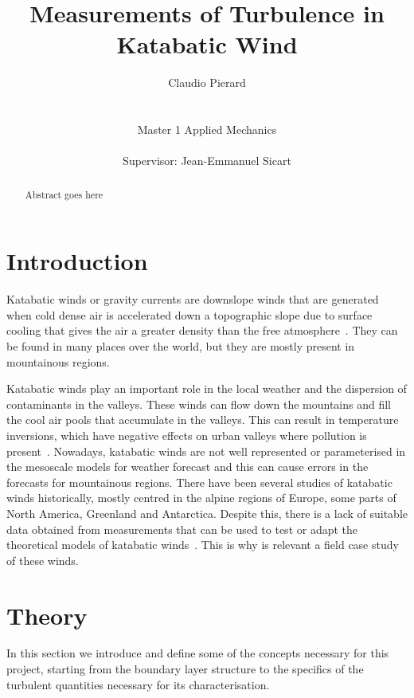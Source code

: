 \documentclass[a4paper,12pt]{article}
\title{Measurements of Turbulence in Katabatic Wind}
\author{Claudio Pierard \\
\\
\\
Master 1 Applied Mechanics\\
\\
Supervisor: Jean-Emmanuel Sicart}
\begin{document}
\renewcommand{\labelitemi}{$\bullet$}

\maketitle
\begin{abstract}
    Abstract goes here
\end{abstract}

\newpage

\tableofcontents

\newpage

\section{Introduction}

Katabatic winds or gravity currents are downslope winds that are generated when cold dense air is accelerated down a topographic slope due to surface cooling that gives the air a greater density than the free atmosphere~\citep{poulos2008observational}. They can be found in many places over the world, but they are mostly present in mountainous regions.

Katabatic winds play an important role in the local weather and the dispersion of contaminants in the valleys. These winds can flow down the mountains and fill the cool air pools that accumulate in the valleys. This can result in temperature inversions, which have negative effects on urban valleys where pollution is present~\citep{largeron2016persistent}. Nowadays, katabatic winds are not well represented or parameterised in the mesoscale models for weather forecast and this can cause errors in the forecasts for mountainous regions. There have been several studies of katabatic winds historically, mostly centred in the alpine regions of Europe, some parts of North America, Greenland and Antarctica. Despite this, there is a lack of suitable data obtained from measurements that can be used to test or adapt the theoretical models of katabatic winds~\citep{manins1979katabatic}. This is why is relevant a field case study of these winds.

\section{Theory}

In this section we introduce and define some of the concepts necessary for this project, starting from the boundary layer structure to the specifics of the turbulent quantities necessary for its characterisation.
\end{document}
